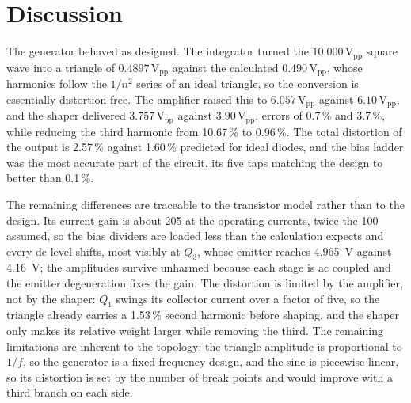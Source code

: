 \documentclass[12pt,a4paper]{article}
\begin{document}
	\section{Discussion}
	The generator behaved as designed. The integrator turned the $10.000\,\mathrm{V_{pp}}$ square wave into a triangle of $0.4897\,\mathrm{V_{pp}}$ against the calculated $0.490\,\mathrm{V_{pp}}$, whose harmonics follow the $1/n^2$ series of an ideal triangle, so the conversion is essentially distortion-free. The amplifier raised this to $6.057\,\mathrm{V_{pp}}$ against $6.10\,\mathrm{V_{pp}}$, and the shaper delivered $3.757\,\mathrm{V_{pp}}$ against $3.90\,\mathrm{V_{pp}}$, errors of 0.7\,\% and 3.7\,\%, while reducing the third harmonic from 10.67\,\% to 0.96\,\%. The total distortion of the output is 2.57\,\% against 1.60\,\% predicted for ideal diodes, and the bias ladder was the most accurate part of the circuit, its five taps matching the design to better than 0.1\,\%.

	The remaining differences are traceable to the transistor model rather than to the design. Its current gain is about 205 at the operating currents, twice the 100 assumed, so the bias dividers are loaded less than the calculation expects and every dc level shifts, most visibly at $Q_3$, whose emitter reaches \SI{4.965}{\volt} against \SI{4.16}{\volt}; the amplitudes survive unharmed because each stage is ac coupled and the emitter degeneration fixes the gain. The distortion is limited by the amplifier, not by the shaper: $Q_1$ swings its collector current over a factor of five, so the triangle already carries a 1.53\,\% second harmonic before shaping, and the shaper only makes its relative weight larger while removing the third. The remaining limitations are inherent to the topology: the triangle amplitude is proportional to $1/f$, so the generator is a fixed-frequency design, and the sine is piecewise linear, so its distortion is set by the number of break points and would improve with a third branch on each side.

\end{document}
